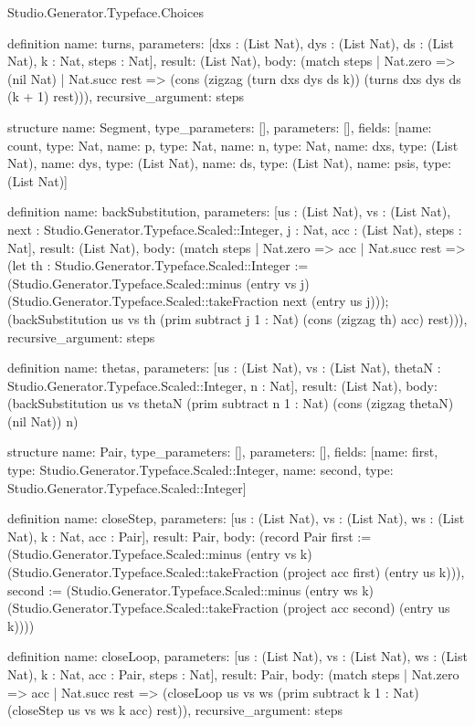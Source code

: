 \begin{lexlean}{Studio.Generator.Typeface.Choices}
\begin{semanticmodule}
definition{
  name: turns,
  parameters: [dxs : (List Nat), dys : (List Nat), ds : (List Nat), k : Nat, steps : Nat],
  result: (List Nat),
  body: (match steps
    | Nat.zero => (nil Nat)
    | Nat.succ rest => (cons (zigzag (turn dxs dys ds k)) (turns dxs dys ds (k + 1) rest))),
  recursive_argument: steps
}

structure{
  name: Segment,
  type_parameters: [],
  parameters: [],
  fields: [{name: count, type: Nat}, {name: p, type: Nat}, {name: n, type: Nat}, {name: dxs, type: (List Nat)}, {name: dys, type: (List Nat)}, {name: ds, type: (List Nat)}, {name: psis, type: (List Nat)}]
}

definition{
  name: backSubstitution,
  parameters: [us : (List Nat), vs : (List Nat), next : Studio.Generator.Typeface.Scaled::Integer, j : Nat, acc : (List Nat), steps : Nat],
  result: (List Nat),
  body: (match steps
    | Nat.zero => acc
    | Nat.succ rest => (let th : Studio.Generator.Typeface.Scaled::Integer := (Studio.Generator.Typeface.Scaled::minus (entry vs j) (Studio.Generator.Typeface.Scaled::takeFraction next (entry us j))); (backSubstitution us vs th (prim subtract j 1 : Nat) (cons (zigzag th) acc) rest))),
  recursive_argument: steps
}

definition{
  name: thetas,
  parameters: [us : (List Nat), vs : (List Nat), thetaN : Studio.Generator.Typeface.Scaled::Integer, n : Nat],
  result: (List Nat),
  body: (backSubstitution us vs thetaN (prim subtract n 1 : Nat) (cons (zigzag thetaN) (nil Nat)) n)
}

structure{
  name: Pair,
  type_parameters: [],
  parameters: [],
  fields: [{name: first, type: Studio.Generator.Typeface.Scaled::Integer}, {name: second, type: Studio.Generator.Typeface.Scaled::Integer}]
}

definition{
  name: closeStep,
  parameters: [us : (List Nat), vs : (List Nat), ws : (List Nat), k : Nat, acc : Pair],
  result: Pair,
  body: (record Pair {first := (Studio.Generator.Typeface.Scaled::minus (entry vs k) (Studio.Generator.Typeface.Scaled::takeFraction (project acc first) (entry us k))), second := (Studio.Generator.Typeface.Scaled::minus (entry ws k) (Studio.Generator.Typeface.Scaled::takeFraction (project acc second) (entry us k)))})
}

definition{
  name: closeLoop,
  parameters: [us : (List Nat), vs : (List Nat), ws : (List Nat), k : Nat, acc : Pair, steps : Nat],
  result: Pair,
  body: (match steps
    | Nat.zero => acc
    | Nat.succ rest => (closeLoop us vs ws (prim subtract k 1 : Nat) (closeStep us vs ws k acc) rest)),
  recursive_argument: steps
}


\end{semanticmodule}
\end{lexlean}
